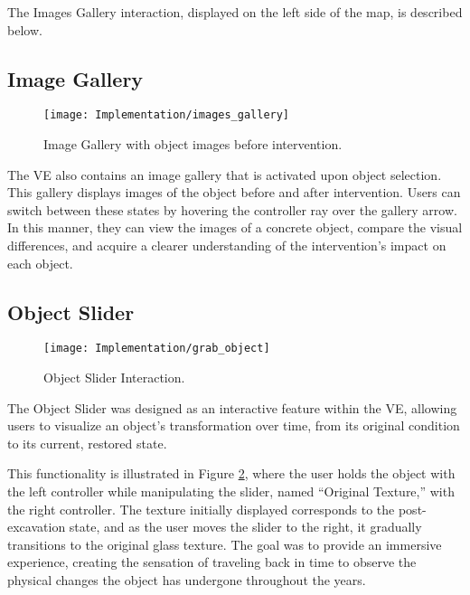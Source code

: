 The Images Gallery interaction, displayed on the left side of the map, is described below.

\subsection*{Image Gallery}
\label{sec:image_gallery}

\begin{figure}[h!]
    \centering
    \texttt{[image: Implementation/images\_gallery]}
    \caption{Image Gallery with object images before intervention.}
    \label{fig:image_gallery}
\end{figure}

The \gls{VE} also contains an image gallery that is activated upon object selection. 
This gallery displays images of the object before and after intervention. 
Users can switch between these states by hovering the controller ray over the gallery arrow. 
In this manner, they can view the images of a concrete object, compare the visual differences, and acquire a clearer understanding of the intervention's impact on each object.

\subsection*{Object Slider}
\label{sec:object_slider}

 \begin{figure}[h!]
    \centering
    \texttt{[image: Implementation/grab\_object]}
    \caption{Object Slider Interaction.}
    \label{fig:object_slider}
\end{figure}

The Object Slider was designed as an interactive feature within the \gls{VE}, allowing users to visualize an object's transformation over time, from its original condition to its current, restored state. 

This functionality is illustrated in Figure \ref{fig:object_slider}, where the user holds the object with the left controller while manipulating the slider, named “Original Texture,” with the right controller. 
The texture initially displayed corresponds to the post-excavation state, and as the user moves the slider to the right, it gradually transitions to the original glass texture.
The goal was to provide an immersive experience, creating the sensation of traveling back in time to observe the physical changes the object has undergone throughout the years.

